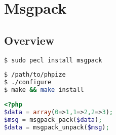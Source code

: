 \part{Msgpack}


\chapter{Overview}


\begin{lstlisting}[language=bash]
$ sudo pecl install msgpack
\end{lstlisting}




\begin{lstlisting}[language=bash]
$ /path/to/phpize
$ ./configure 
$ make && make install
\end{lstlisting}





\begin{lstlisting}[language=PHP]
<?php
$data = array(0=>1,1=>2,2=>3);
$msg = msgpack_pack($data);
$data = msgpack_unpack($msg);
\end{lstlisting}